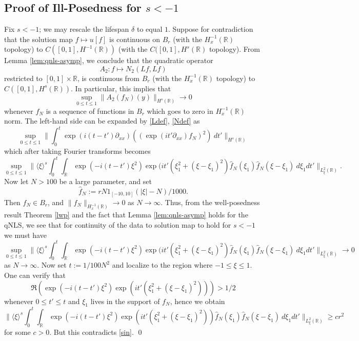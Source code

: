\documentclass[12pt,reqno]{amsart}
\numberwithin{equation}{section}  %
\newcommand{\rr}{\mathbb{R}}
\newcommand{\R}{\mathbb{R}}
\begin{document}
\subsection{Proof of Ill-Posedness for $s < -1$} 
%
%
%
Fix $s < -1$; we may rescale the lifespan $\delta$ to equal $1$.  Suppose for contradiction
that the solution map $f \mapsto u[f]$ is continuous on $B_r$ (with the
$H^{-1}_x(\R)$ topology) to $C([0, 1], H^{-1}(\rr))$ 
(with the $C([0,1], H^{s}(\rr)$ topology). From 
Lemma \ref{lem:qnls-asymp}, we conclude that the quadratic operator
$$ A_2: f \mapsto N_2(Lf, Lf)$$ 
restricted to $[0,1] \times \R$, is continuous from $B_r$ (with the $H^{-1}_x(\R)$ topology) 
to $C([0,1], H^{s}(\rr))$.  In particular, this implies that
$$ \sup_{0 \leq t\leq 1}\| A_2(f_N)(y) \|_{H^{s}(\R)} \to 0$$
whenever $f_N$ is a sequence of functions in $B_r$ which goes to zero in $H^{-1}_x(\R)$ norm.
The left-hand side can be expanded by \eqref{Ldef}, \eqref{Ndef} as
$$ \sup_{0 \leq t \leq 1} 
\| \int_0^t \exp(i(t-t')\partial_{xx})((\exp(it' \partial_{xx}) f_N)^2)\ dt' \|_{H^{s}(\R)}$$
which after taking Fourier transforms becomes
$$\sup_{0 \leq t \leq 1} 
\| \langle \xi \rangle^{s}
\int_0^t \int_\R \exp(-i(t-t')\xi^2) \exp(it' (\xi_1^2 + (\xi-\xi_1)^2) \hat f_N(\xi_1) \hat f_N(\xi-\xi_1)\ d\xi_1 dt'
\|_{L^2_\xi(\R)}.$$
Now let $N > 100$ be a large parameter, and set 
$$ \hat f_N := r N 1_{[-10,10]}(|\xi|-N) / 1000.$$
Then $f_N \in B_r$, and $\|f_N\|_{H^{-1}_x(\R)} \to 0$ as $N \to \infty$.  Thus,
from the well-posedness result Theorem \ref{lwp} and the fact that
Lemma \ref{lem:qnls-asymp}
holds for
the qNLS, we see that for continuity of the data to solution map to hold for $s < -1$ we must have
\begin{equation}\label{sin}
\sup_{0 \leq t \leq 1} \| \langle \xi \rangle^{s}
\int_0^t \int_\R \exp(-i(t-t')\xi^2) \exp(it' (\xi_1^2 + (\xi-\xi_1)^2) \hat f_N(\xi_1) \hat f_N(\xi-\xi_1)\ d\xi_1 dt'
\|_{L^2_\xi(\R)} \to 0
\end{equation}
as $N \to \infty$.
Now set $t := 1/100N^2$ and localize to the region where $-1 \leq \xi \leq 1$.  One can verify that
$$ \Re( \exp(-i(t-t')\xi^2) \exp(it' (\xi_1^2 + (\xi-\xi_1)^2) )) > 1/2$$
whenever $0 \leq t' \leq t$ and $\xi_1$ lives in the support of $f_{N}$, hence we obtain
$$ 
\| \langle \xi \rangle^{s}
\int_0^t \int_\R \exp(-i(t-t')\xi^2) \exp(it' (\xi_1^2 + (\xi-\xi_1)^2)) \hat f_N(\xi_1) \hat f_N(\xi-\xi_1)\ d\xi_1 dt'
\|_{L^2_\xi(\R)} \geq c r^2$$
for some $c > 0$.  But this contradicts \eqref{sin}. \qed
%
%


\end{document}
